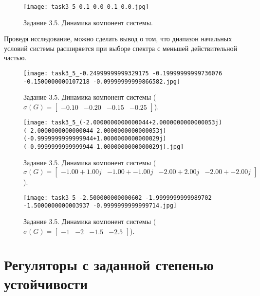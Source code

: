 \begin{figure}
        \centering
        \texttt{[image: task3\_5\_0.1\_0.0\_0.1\_0.0.jpg]}
        \caption{Задание 3.5. Динамика компонент системы.}
        \label{fig:task3_5.jpg}
\end{figure}

Проведя исследование, можно сделать вывод о том, что диапазон начальных условий системы расширяется при выборе спектра с меньшей действительной частью.

\begin{figure}
    \centering
    \texttt{[image: task3\_5\_-0.24999999999329175 -0.19999999999736076 -0.1500000000107218 -0.09999999999866582.jpg]}
    \caption{Задание 3.5. Динамика компонент системы ($\sigma(G) = \begin{bmatrix} -0.10 & -0.20 & -0.15 & -0.25 \end{bmatrix}$).}
    \label{fig:task3_5_1.jpg}
\end{figure}
\begin{figure}
    \centering
    \texttt{[image: task3\_5\_(-2.0000000000000044+2.0000000000000053j) (-2.0000000000000044-2.0000000000000053j) (-0.9999999999999944+1.0000000000000029j) (-0.9999999999999944-1.0000000000000029j).jpg]}
    \caption{Задание 3.5. Динамика компонент системы ($\sigma(G) = \begin{bmatrix} -1.00 + 1.00j & -1.00 + -1.00j & -2.00 + 2.00j & -2.00 + -2.00j \end{bmatrix}$).}
    \label{fig:task3_5_2.jpg}
\end{figure}
\begin{figure}
    \centering
    \texttt{[image: task3\_5\_-2.500000000000602 -1.9999999999989702 -1.5000000000003937 -0.9999999999999714.jpg]}
    \caption{Задание 3.5. Динамика компонент системы ($\sigma(G) = \begin{bmatrix} -1 & -2 & -1.5 & -2.5 \end{bmatrix}$).}
    \label{fig:task3_5_3.jpg}
\end{figure}


\section{Регуляторы с заданной степенью устойчивости}

